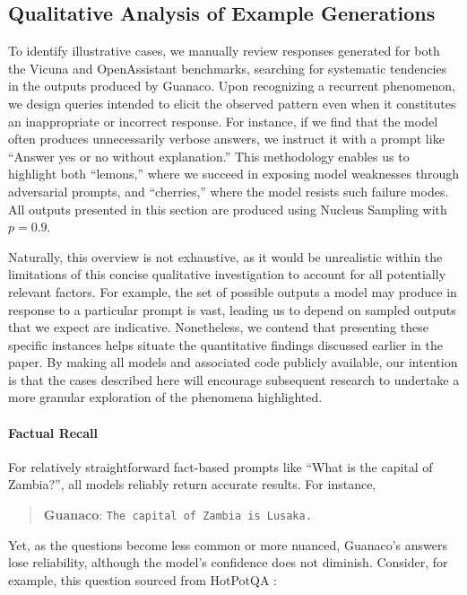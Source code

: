 \subsection{Qualitative Analysis of Example Generations}
\label{ssec:examples}

To identify illustrative cases, we manually review responses generated for both the Vicuna and OpenAssistant benchmarks, searching for systematic tendencies in the outputs produced by {Guanaco}. Upon recognizing a recurrent phenomenon, we design queries intended to elicit the observed pattern even when it constitutes an inappropriate or incorrect response. For instance, if we find that the model often produces unnecessarily verbose answers, we instruct it with a prompt like ``Answer yes or no without explanation.'' This methodology enables us to highlight both ``lemons,'' where we succeed in exposing model weaknesses through adversarial prompts, and ``cherries,'' where the model resists such failure modes. All outputs presented in this section are produced using Nucleus Sampling \cite{holtzmancurious} with $p=0.9$.

Naturally, this overview is not exhaustive, as it would be unrealistic within the limitations of this concise qualitative investigation to account for all potentially relevant factors. For example, the set of possible outputs a model may produce in response to a particular prompt is vast, leading us to depend on sampled outputs that we expect are indicative. Nonetheless, we contend that presenting these specific instances helps situate the quantitative findings discussed earlier in the paper. By making all models and associated code publicly available, our intention is that the cases described here will encourage subsequent research to undertake a more granular exploration of the phenomena highlighted.

\paragraph{Factual Recall} For relatively straightforward fact-based prompts like ``What is the capital of Zambia?'', all models reliably return accurate results. For instance,

\begin{quote} 
    \textbf{Guanaco}:
    \texttt{The capital of Zambia is Lusaka.}
\end{quote}

Yet, as the questions become less common or more nuanced, {Guanaco}'s answers lose reliability, although the model’s confidence does not diminish. Consider, for example, this question sourced from HotPotQA \citep{yang2018hotpotqa}:

